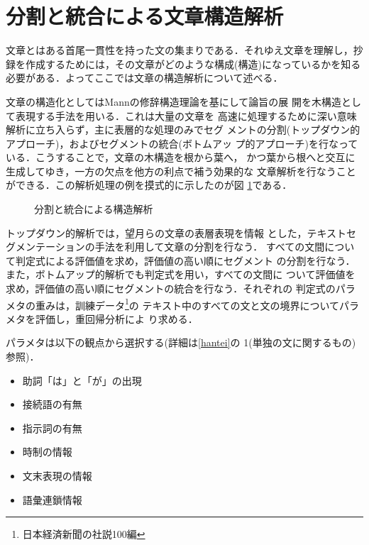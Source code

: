 \section{分割と統合による文章構造解析} \label{structure}

文章とはある首尾一貫性を持った文の集まりである．それゆえ文章を理解し，抄
録を作成するためには，その文章がどのような構成(構造)になっているかを知る
必要がある．よってここでは文章の構造解析について述べる．

文章の構造化としてはMann\cite{Mann:87:a}の修辞構造理論を基にして論旨の展
開を木構造として表現する手法\cite{Tamura:98}を用いる．これは大量の文章を
高速に処理するために深い意味解析に立ち入らず，主に表層的な処理のみでセグ
メントの分割(トップダウン的アプローチ)，およびセグメントの統合(ボトムアッ
プ的アプローチ)を行なっている．こうすることで，文章の木構造を根から葉へ，
かつ葉から根へと交互に生成してゆき，一方の欠点を他方の利点で補う効果的な
文章解析を行なうことができる．この解析処理の例を摸式的に示したのが図
\ref{fig:kaiseki}である．

\begin{figure}[hbtp]
 \begin{center}
  \caption{分割と統合による構造解析}
  \label{fig:kaiseki}
 \end{center}
\end{figure}

トップダウン的解析では，望月ら\cite{Mochiduki:96}の文章の表層表現を情報
とした，テキストセグメンテーションの手法を利用して文章の分割を行なう．
すべての文間について判定式による評価値を求め，評価値の高い順にセグメント
の分割を行なう．また，ボトムアップ的解析でも判定式を用い，すべての文間に
ついて評価値を求め，評価値の高い順にセグメントの統合を行なう．それぞれの
判定式のパラメタの重みは，訓練データ\footnote{日本経済新聞の社説100編}の
テキスト中のすべての文と文の境界についてパラメタを評価し，重回帰分析によ
り求める．

パラメタは以下の観点から選択する\cite{Mochiduki:96}(詳細は\ref{hantei}の
1(単独の文に関するもの)参照)．

\begin{itemize}
 \item 助詞「は」と「が」の出現
 \item 接続語の有無
 \item 指示詞の有無
 \item 時制の情報
 \item 文末表現の情報
 \item 語彙連鎖情報
\end{itemize} 

